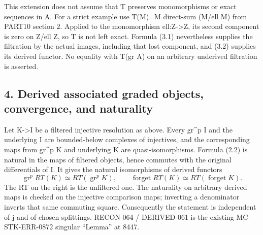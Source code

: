 This extension does not assume that T preserves monomorphisms or exact sequences in A. For a strict example use T(M)\allowbreak{}\allowbreak{}=M direct-sum (M/\allowbreak{}ell M)\allowbreak{} from PART10 section 2. Applied to the monomorphism ell:\allowbreak{}Z\allowbreak{}->Z,\allowbreak{} its second component is zero on Z/\allowbreak{}ell Z,\allowbreak{} so T is not left exact. Formula (3.1)\allowbreak{} nevertheless supplies the filtration by the actual images,\allowbreak{} including that lost component,\allowbreak{} and (3.2)\allowbreak{} supplies its derived functor. No equality with T(gr A)\allowbreak{} on an arbitrary underived filtration is asserted.

\subsection{\texorpdfstring{4. Derived associated graded objects,\allowbreak{} convergence,\allowbreak{} and naturality}{4. Derived associated graded   and naturality}}\label{proofs-8352-8772-derived-associated-graded-objects-convergence-and-naturality}

Let K\allowbreak{}->I be a filtered injective resolution as above. Every gr\^{}p I and the underlying I are bounded-below complexes of injectives,\allowbreak{} and the corresponding maps from gr\^{}p K and underlying K are quasi-isomorphisms. Formula (2.2)\allowbreak{} is natural in the maps of filtered objects,\allowbreak{} hence commutes with the original differentials of I. It gives the natural isomorphisms of derived functors \[
 \operatorname{gr}^p RT(K)\simeq RT(\operatorname{gr}^p K),
 \qquad
 \operatorname{forget}RT(K)\simeq RT(\operatorname{forget}K).
                                                               \tag{4.1}
\] The RT on the right is the unfiltered one. The naturality on arbitrary derived maps is checked on the injective comparison maps; inverting a denominator inverts that same commuting square. Consequently the statement is independent of j\textquotesingle{} and of chosen splittings. RECON-064 /\allowbreak{} DERIVED-061 is the existing MC-STK-ERR-0872 singular ``Lemma'' at 8447.

